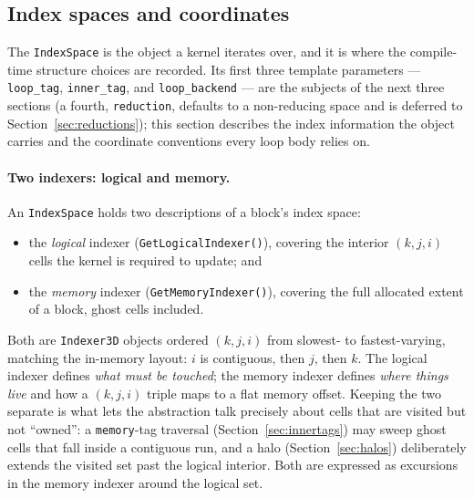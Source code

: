 \documentclass[11pt]{article}
\newcommand{\code}[1]{\lstinline[basicstyle=\ttfamily]|#1|}
\begin{document}
\subsection{Index spaces and coordinates}
\label{sec:indexspace}

The \code{IndexSpace} is the object a kernel iterates over, and it is where the
compile-time structure choices are recorded. Its first three template parameters ---
\code{loop_tag}, \code{inner_tag}, and \code{loop_backend} --- are the subjects of
the next three sections (a fourth, \code{reduction}, defaults to a non-reducing space
and is deferred to Section~\ref{sec:reductions}); this section describes the index
information the object carries and the coordinate conventions every loop body relies
on.

\paragraph{Two indexers: logical and memory.} An \code{IndexSpace} holds two
descriptions of a block's index space:
\begin{itemize}
\item the \emph{logical} indexer (\code{GetLogicalIndexer()}), covering the
  interior $(k,j,i)$ cells the kernel is required to update; and
\item the \emph{memory} indexer (\code{GetMemoryIndexer()}), covering the full
  allocated extent of a block, ghost cells included.
\end{itemize}
Both are \code{Indexer3D} objects ordered $(k, j, i)$ from slowest- to
fastest-varying, matching the in-memory layout: $i$ is contiguous, then $j$, then
$k$. The logical indexer defines \emph{what must be touched}; the memory indexer
defines \emph{where things live} and how a $(k,j,i)$ triple maps to a flat memory
offset. Keeping the two separate is what lets the abstraction talk precisely about
cells that are visited but not ``owned'': a \code{memory}-tag traversal
(Section~\ref{sec:innertags}) may sweep ghost cells that fall inside a contiguous
run, and a halo (Section~\ref{sec:halos}) deliberately extends the visited set
past the logical interior. Both are expressed as excursions in the memory indexer
around the logical set.
\end{document}
